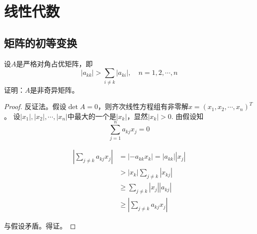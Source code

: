 \chapter{线性代数}

\section{矩阵的初等变换}

\begin{theorem}

    设$A$是严格对角占优矩阵，即
    $$|a_{kk}| > \sum\limits_{i \neq k}{|a_{ki}|}, \quad n = 1, 2, \cdots , n$$
    证明：$A$是非奇异矩阵。

\end{theorem}

\begin{proof}
    
    反证法。假设$\det A = 0$，则齐次线性方程组有非零解$x = (x_1, x_2, \cdots , x_n)^{T}$。
    设$|x_1|, |x_2|, \cdots , |x_n|$中最大的一个是$|x_k|$，显然$|x_k| > 0$. 由假设知
    $$\sum\limits_{j = 1}^{n}{a_{kj}x_j}  = 0$$
    
    \begin{align*}
        \left| \sum\limits_{j \neq k}{a_{kj}x_j} \right| & = |-a_{kk}x_k| = |a_{kk}||x_j| \\ 
        & > |x_k| \sum\limits_{j \neq k}{|x_{kj}|} \\
        & \geq \sum\limits_{j \neq k}{|x_j||a_{kj}|} \\
        & \geq \left| \sum\limits_{j \neq k}{a_{kj}x_j} \right|
    \end{align*}

    与假设矛盾。得证。
    
\end{proof}